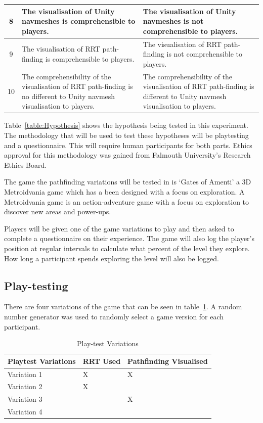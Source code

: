 \documentclass[journal]{IEEEtran}
\begin{document}
\begin{table}[h]
\begin{tabular}{|c|p{7.5cm}|p{7.5cm}|}
			8 &   The visualisation of  Unity navmeshes is comprehensible to players.
			&  The visualisation of  Unity navmeshes is not comprehensible to players.
			\\ \hline
			
			9 &  The visualisation of  RRT path-finding is comprehensible to players.
			&  The visualisation of  RRT path-finding is not comprehensible to players.
			\\ \hline
			
			10 &  The comprehensibility of the visualisation of RRT path-finding is no different to Unity navmesh visualisation to players.
			&  The comprehensibility of the visualisation of RRT path-finding is different to Unity navmesh visualisation to players.
			\\ \hline
		\end{tabular}
	\end{table}
	Table~\ref{table:Hypothesis} shows the hypothesis being tested in this experiment. The methodology that will be used to test these hypotheses will be playtesting and a questionnaire. This will require human participants for both parts. Ethics approval for this methodology was gained from Falmouth University’s Research Ethics Board.
	
	The game the pathfinding variations will be tested in is `Gates of Amenti' a 3D Metroidvania game which has a been designed with a focus on exploration. A Metroidvania game is an action-adventure game with a focus on exploration to discover new areas and power-ups.
	
	Players will be given one of the game variations to play and then asked to complete a questionnaire on their experience. The game will also log the player's position at regular intervals to calculate what percent of the level they explore. How long a participant spends exploring the level will also be logged.
	
	\subsection{Play-testing}
	There are four variations of the game that can be seen in table~\ref{table:PlaytestVariations}.  A random number generator was used to randomly select a game version for each participant.
	
	\begin{table}[H]
		\centering
		\caption{Play-test Variations}
		\label{table:PlaytestVariations}
		\def\arraystretch{1.5}
		\begin{tabular}{ |l|l|l|}
			\hline
			\textbf{Playtest Variations} & \textbf{RRT Used}& \textbf{Pathfinding Visualised} \\ \hline
			Variation 1  &  X & X \\ \hline
			Variation 2  &  X &  \\ \hline
			Variation 3  &    & X \\ \hline
			Variation 4  &    &  \\ \hline
		\end{tabular}
	\end{table}
	
\end{document}
